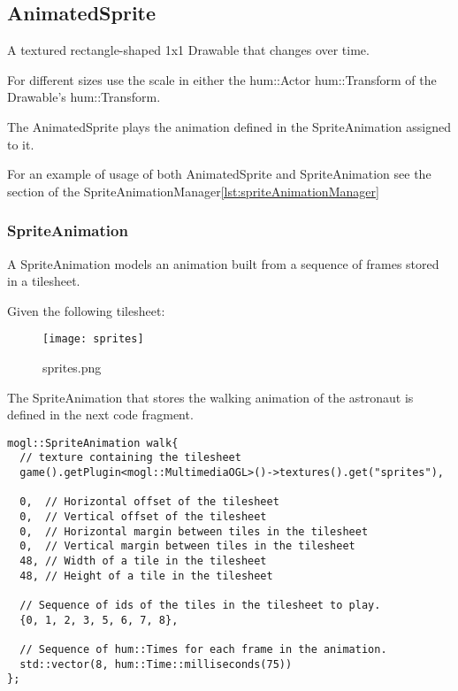 \subsection{AnimatedSprite}
A textured rectangle-shaped 1x1 Drawable that changes over time.

For different sizes use the scale in either the hum::Actor hum::Transform of
the Drawable's hum::Transform.

The AnimatedSprite plays the animation defined in the SpriteAnimation assigned to it.

For an example of usage of both AnimatedSprite and SpriteAnimation see the section 
of the SpriteAnimationManager\ref{lst:spriteAnimationManager}

\subsubsection{SpriteAnimation}

A SpriteAnimation models an animation built from a sequence of frames stored in a 
tilesheet.

Given the following tilesheet:
\begin{figure}[H]
    \centering
    \texttt{[image: sprites]}
    \caption{sprites.png}
    \label{fig:sprites}
\end{figure}

The SpriteAnimation that stores the walking animation of the astronaut is defined 
in the next code fragment.

\begin{lstlisting}[caption=Astronaut walking animation]
mogl::SpriteAnimation walk{
  // texture containing the tilesheet
  game().getPlugin<mogl::MultimediaOGL>()->textures().get("sprites"),

  0,  // Horizontal offset of the tilesheet
  0,  // Vertical offset of the tilesheet
  0,  // Horizontal margin between tiles in the tilesheet
  0,  // Vertical margin between tiles in the tilesheet
  48, // Width of a tile in the tilesheet
  48, // Height of a tile in the tilesheet

  // Sequence of ids of the tiles in the tilesheet to play.
  {0, 1, 2, 3, 5, 6, 7, 8},

  // Sequence of hum::Times for each frame in the animation.
  std::vector(8, hum::Time::milliseconds(75))
};
\end{lstlisting}
